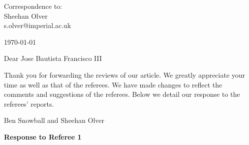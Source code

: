 \documentclass[10pt]{letter}
\begin{document}
\thispagestyle{empty}

\hfill
\begin{flushright}
Correspondence to: \\
Sheehan Olver \\
s.olver@imperial.ac.uk \\
\end{flushright}

\vspace{1em}
\hfill\today

Dear Jose Bautista Francisco III

Thank you for forwarding the reviews of our article. We greatly appreciate your time as well as that of the referees.  We have made changes to reflect the comments and suggestions of the referees. Below we detail our response to the referees' reports. 

Ben Snowball and Sheehan Olver

\bigskip 

\centerline{\textbf{Response to Referee 1}}
\end{document}

